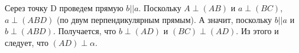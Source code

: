 Серез точку D проведем прямую $b||a$. Поскольку $A\perp (AB)$ и $a\perp (BC)$, $a\perp (ABD)$ (по двум перпендикулярным прямым). А значит, поскольку $b||a$ и $b\perp (ABD)$. Получается, что $b\perp (AD)$ и $(BC)\perp (AD)$. Из этого и следует, что $(AD)\perp \alpha$.